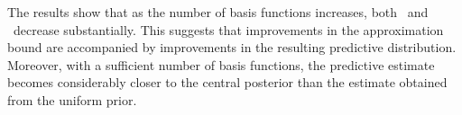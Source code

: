The results show that as the number of basis functions increases, both \Fdelta\ and \PredErr\ decrease substantially.
This suggests that improvements in the approximation bound are accompanied by improvements in the resulting
predictive distribution.
Moreover, with a sufficient number of basis functions, the predictive estimate becomes considerably closer to the
central posterior than the estimate obtained from the uniform prior.

